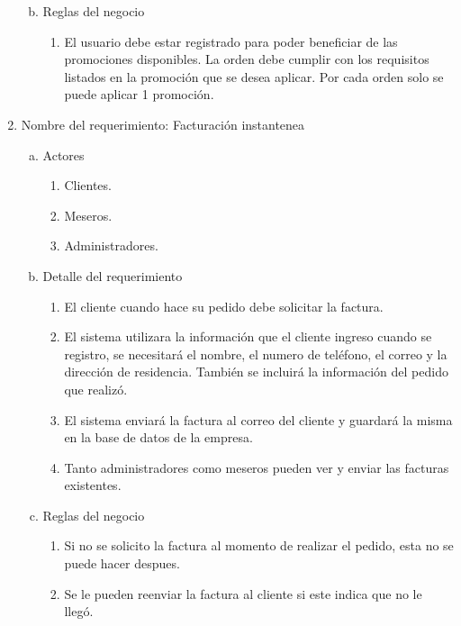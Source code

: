 \documentclass[conference]{IEEEtran}
\begin{document}
\begin{enumerate}
\begin{enumerate}[a)]
\begin{enumerate}[P{a}so 1.]
	\end{enumerate}
	
\item Reglas del negocio
\begin{enumerate}[a]
\item El usuario debe estar registrado para poder beneficiar de las promociones disponibles. La orden debe cumplir con los requisitos listados en la promoción que se desea aplicar. Por cada orden solo se puede aplicar 1 promoción.
\end{enumerate}
\end{enumerate}
\item Nombre del requerimiento: Facturación instantenea
\begin{enumerate}[a)]
\item Actores
	\begin{enumerate}[a]
	\item Clientes.
	\item Meseros.
	\item Administradores.
	\end{enumerate}
\item Detalle del requerimiento
	\begin{enumerate}[P{a}so 1.]
	\item El cliente cuando hace su pedido debe solicitar la factura.
	\item El sistema utilizara la información que el cliente ingreso cuando se registro, se necesitará el nombre, el numero de teléfono, el correo y la dirección de residencia. También se incluirá la información del pedido que realizó.
	\item El sistema enviará la factura al correo del cliente y guardará la misma en la base de datos de la empresa.
	\item Tanto administradores como meseros pueden ver y enviar las facturas existentes.
	\end{enumerate}
\item Reglas del negocio
	\begin{enumerate}[a]
	\item Si no se solicito la factura al momento de realizar el pedido, esta no se puede hacer despues.
	\item Se le pueden reenviar la factura al cliente si este indica que no le llegó.
	\end{enumerate}
\end{enumerate}


\end{enumerate}
\end{document}
